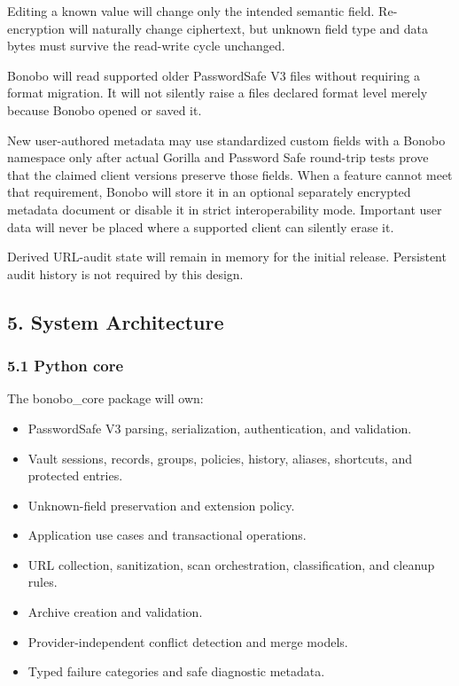 \documentclass[
  letterpaper,
]{article}
\providecommand{\tightlist}{%
  \setlength{\itemsep}{0pt}\setlength{\parskip}{0pt}}
\begin{document}
Editing a known value will change only the intended semantic field. Re-encryption will naturally change ciphertext, but
unknown field type and data bytes must survive the read-write cycle unchanged.

Bonobo will read supported older PasswordSafe V3 files without requiring a format migration. It will not silently raise
a file\textquotesingle s declared format level merely because Bonobo opened or saved it.

New user-authored metadata may use standardized custom fields with a Bonobo namespace only after actual Gorilla and
Password Safe round-trip tests prove that the claimed client versions preserve those fields. When a feature cannot meet
that requirement, Bonobo will store it in an optional separately encrypted metadata document or disable it in strict
interoperability mode. Important user data will never be placed where a supported client can silently erase it.

Derived URL-audit state will remain in memory for the initial release. Persistent audit history is not required by this
design.

\subsection{5. System Architecture}\label{5-system-architecture}

\subsubsection{5.1 Python core}\label{51-python-core}

The bonobo\_core package will own:

\begin{itemize}
\tightlist
\item
  PasswordSafe V3 parsing, serialization, authentication, and validation.
\item
  Vault sessions, records, groups, policies, history, aliases, shortcuts, and protected entries.
\item
  Unknown-field preservation and extension policy.
\item
  Application use cases and transactional operations.
\item
  URL collection, sanitization, scan orchestration, classification, and cleanup rules.
\item
  Archive creation and validation.
\item
  Provider-independent conflict detection and merge models.
\item
  Typed failure categories and safe diagnostic metadata.
\end{itemize}
\end{document}
